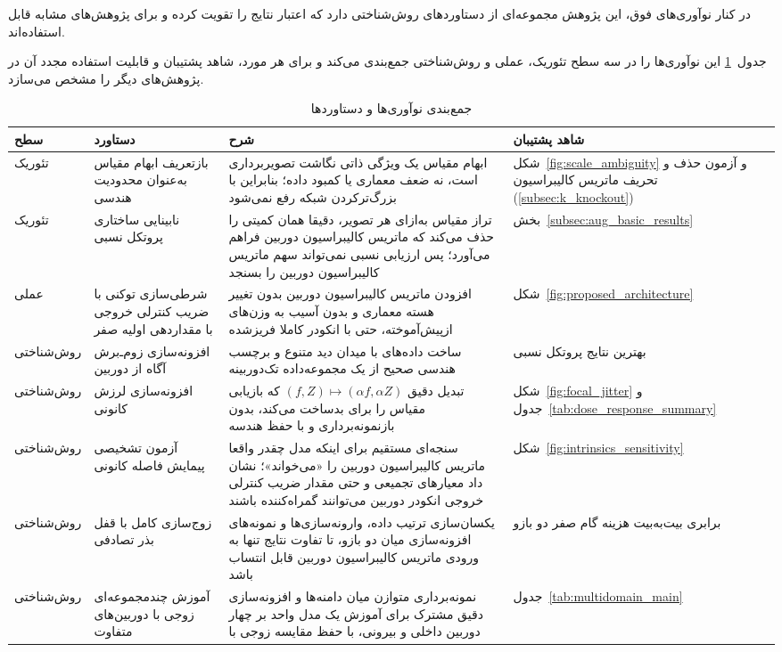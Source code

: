 در کنار نوآوری‌های فوق، این پژوهش مجموعه‌ای از دستاوردهای روش‌شناختی
دارد که اعتبار نتایج را تقویت کرده و برای پژوهش‌های مشابه قابل استفاده‌اند.

جدول~\ref{tab:contributions_summary} این نوآوری‌ها را در سه سطح تئوریک،
عملی و روش‌شناختی جمع‌بندی می‌کند و برای هر مورد، شاهد پشتیبان و
قابلیت استفاده مجدد آن در پژوهش‌های دیگر را مشخص می‌سازد.

\begin{table}[htbp]
\centering
\caption{جمع‌بندی نوآوری‌ها و دستاوردها}
\label{tab:contributions_summary}
\footnotesize
\renewcommand{\arraystretch}{1.3}
\begin{tabularx}{\textwidth}{@{}
 >{\raggedleft\arraybackslash}p{}
 >{\raggedleft\arraybackslash}p{}
 >{\raggedleft\arraybackslash}X
 >{\raggedleft\arraybackslash}p{}@{}}
\toprule
سطح & دستاورد & شرح & شاهد پشتیبان \\ \midrule
تئوریک & بازتعریف ابهام مقیاس به‌عنوان محدودیت هندسی &
ابهام مقیاس یک ویژگی ذاتی نگاشت تصویربرداری است، نه ضعف معماری یا کمبود داده؛ بنابراین با بزرگ‌ترکردن شبکه رفع نمی‌شود &
شکل~\ref{fig:scale_ambiguity} و آزمون حذف و تحریف ماتریس کالیبراسیون (\ref{subsec:k_knockout}) \\
تئوریک & نابینایی ساختاری پروتکل نسبی &
تراز مقیاس به‌ازای هر تصویر، دقیقا همان کمیتی را حذف می‌کند که ماتریس کالیبراسیون دوربین فراهم می‌آورد؛ پس ارزیابی نسبی نمی‌تواند سهم ماتریس کالیبراسیون دوربین را بسنجد &
بخش~\ref{subsec:aug_basic_results} \\
عملی & شرطی‌سازی توکنی با ضریب کنترلی خروجی با مقداردهی اولیه صفر &
افزودن ماتریس کالیبراسیون دوربین بدون تغییر هسته معماری و بدون آسیب به وزن‌های ازپیش‌آموخته، حتی با انکودر کاملا فریزشده &
شکل~\ref{fig:proposed_architecture} \\
روش‌شناختی & افزونه‌سازی زوم‌ـ‌برش آگاه از دوربین &
ساخت داده‌های با میدان دید متنوع و برچسب هندسی صحیح از یک مجموعه‌داده تک‌دوربینه &
بهترین نتایج پروتکل نسبی \\
روش‌شناختی & افزونه‌سازی لرزش کانونی &
تبدیل دقیق $(f,Z)\mapsto(\alpha f,\alpha Z)$ که بازیابی مقیاس را برای \controlmodel{} بدساخت می‌کند، بدون بازنمونه‌برداری و با حفظ هندسه &
شکل~\ref{fig:focal_jitter} و جدول~\ref{tab:dose_response_summary} \\
روش‌شناختی & آزمون تشخیصی پیمایش فاصله کانونی &
سنجه‌ای مستقیم برای اینکه مدل چقدر واقعا ماتریس کالیبراسیون دوربین را «می‌خواند»؛ نشان داد معیارهای تجمیعی و حتی مقدار ضریب کنترلی خروجی انکودر دوربین می‌توانند گمراه‌کننده باشند &
شکل~\ref{fig:intrinsics_sensitivity} \\
روش‌شناختی & زوج‌سازی کامل با قفل بذر تصادفی &
یکسان‌سازی ترتیب داده، وارونه‌سازی‌ها و نمونه‌های افزونه‌سازی میان دو بازو، تا تفاوت نتایج تنها به ورودی ماتریس کالیبراسیون دوربین قابل انتساب باشد &
برابری بیت‌به‌بیت هزینه گام صفر دو بازو \\
روش‌شناختی & آموزش چندمجموعه‌ای زوجی با دوربین‌های متفاوت &
نمونه‌برداری متوازن میان دامنه‌ها و افزونه‌سازی دقیق مشترک برای آموزش یک مدل واحد بر چهار دوربین داخلی و بیرونی، با حفظ مقایسه زوجی با \controlmodel{} &
جدول~\ref{tab:multidomain_main} \\
\bottomrule
\end{tabularx}
\end{table}

